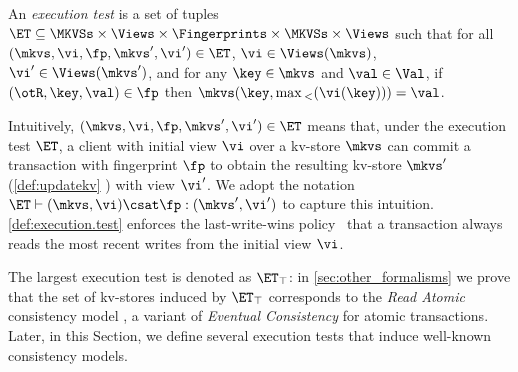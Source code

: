 \begin{definition}
\label{def:execution.test}
An \emph{execution test} is a set of tuples $\ET \subseteq \MKVSs \times \Views \times \Fingerprints \times \MKVSs \times \Views$ 
such that for all $(\mkvs, \vi, \fp, \mkvs', \vi') \in \ET$, 
$\vi \in \Views(\mkvs)$, $\vi' \in \Views(\mkvs')$, and  
for any $\key \in
\mkvs$ and $\val \in \Val$, if $(\otR, \key, \val) \in \fp $ then $	\mkvs(\key, \max{}_{<}(\vi(\key))) = \val   $.
%
\end{definition}
%
\noindent 
Intuitively, $(\mkvs, \vi, \fp, \mkvs', \vi') \in \ET$ means that, under the execution test $\ET$,
a client with initial view $\vi$ over a kv-store $\mkvs$ can commit a transaction with 
fingerprint $\fp$ to obtain the resulting kv-store $\mkvs'$ (\cref{def:updatekv} ) with  view
$\vi'$. We adopt the 
notation $\ET \vdash (\mkvs, \vi) \csat \fp: (\mkvs', \vi')$  to
capture this intuition. 
\cref{def:execution.test} enforces the last-write-wins
policy~\cite{vogels:2009:ec:1435417.1435432} that 
a transaction always reads the most recent writes from the initial view \(\vi\).  

The largest execution test is denoted as $\ET_{\top}$: 
in \cref{sec:other_formalisms} we prove that the set of kv-stores induced by $\ET_{\top}$ 
corresponds to the \emph{Read Atomic} consistency model \cite{ramp}, a variant of \emph{Eventual 
Consistency} \cite{ev_transactions} for atomic transactions. Later, in this Section, 
we define several execution tests that induce well-known consistency models.

